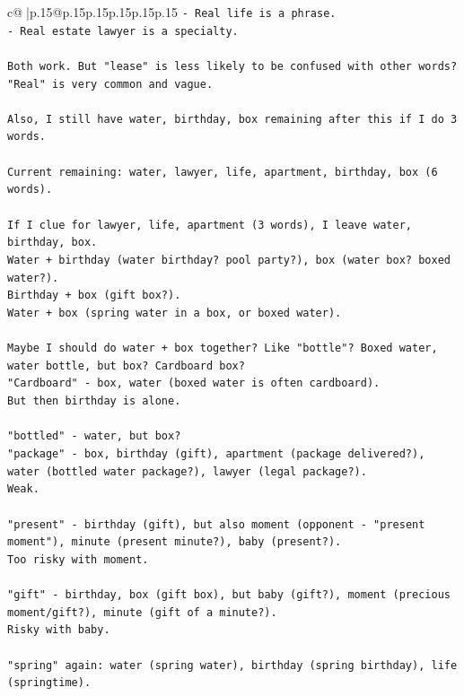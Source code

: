 \documentclass{article}
\begin{document}
{\begin{supertabular}{c@{$\;$}|p{.15\linewidth}@{}p{.15\linewidth}p{.15\linewidth}p{.15\linewidth}p{.15\linewidth}p{.15\linewidth}}
{{{\texttt{{-} Real life is a phrase.} \\
\texttt{{-} Real estate lawyer is a specialty.} \\
\\ 
\texttt{Both work. But "lease" is less likely to be confused with other words? "Real" is very common and vague.} \\
\\ 
\texttt{Also, I still have water, birthday, box remaining after this if I do 3 words.} \\
\\ 
\texttt{Current remaining: water, lawyer, life, apartment, birthday, box (6 words).} \\
\\ 
\texttt{If I clue for lawyer, life, apartment (3 words), I leave water, birthday, box.} \\
\texttt{Water + birthday (water birthday? pool party?), box (water box? boxed water?).} \\
\texttt{Birthday + box (gift box?).} \\
\texttt{Water + box (spring water in a box, or boxed water).} \\
\\ 
\texttt{Maybe I should do water + box together? Like "bottle"? Boxed water, water bottle, but box? Cardboard box?} \\
\texttt{"Cardboard" {-} box, water (boxed water is often cardboard).} \\
\texttt{But then birthday is alone.} \\
\\ 
\texttt{"bottled" {-} water, but box?} \\
\texttt{"package" {-} box, birthday (gift), apartment (package delivered?), water (bottled water package?), lawyer (legal package?).} \\
\texttt{Weak.} \\
\\ 
\texttt{"present" {-} birthday (gift), but also moment (opponent {-} "present moment"), minute (present minute?), baby (present?).} \\
\texttt{Too risky with moment.} \\
\\ 
\texttt{"gift" {-} birthday, box (gift box), but baby (gift?), moment (precious moment/gift?), minute (gift of a minute?).} \\
\texttt{Risky with baby.} \\
\\ 
\texttt{"spring" again: water (spring water), birthday (spring birthday), life (springtime).} \\
}}}
\end{supertabular}}
\end{document}
